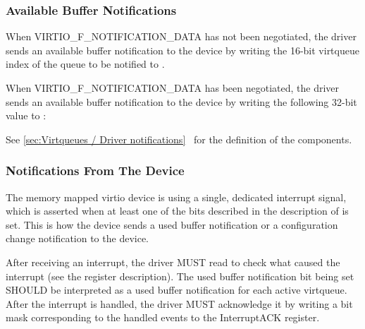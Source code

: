 \subsubsection{Available Buffer Notifications}\label{sec:Virtio Transport Options / Virtio Over MMIO / MMIO-specific Initialization And Device Operation / Available Buffer Notifications}

When VIRTIO_F_NOTIFICATION_DATA has not been negotiated,
the driver sends an available buffer notification to the device by writing
the 16-bit virtqueue index
of the queue to be notified to .

When VIRTIO_F_NOTIFICATION_DATA has been negotiated,
the driver sends an available buffer notification to the device by writing
the following 32-bit value to :


See \ref{sec:Virtqueues / Driver notifications}~
for the definition of the components.

\subsubsection{Notifications From The Device}\label{sec:Virtio Transport Options / Virtio Over MMIO / MMIO-specific Initialization And Device Operation / Notifications From The Device}

The memory mapped virtio device is using a single, dedicated
interrupt signal, which is asserted when at least one of the
bits described in the description of 
is set. This is how the device sends a used buffer notification
or a configuration change notification to the device.

After receiving an interrupt, the driver MUST read
 to check what caused the interrupt (see the
register description).  The used buffer notification bit being set
SHOULD be interpreted as a used buffer notification for each active
virtqueue.  After the interrupt is handled, the driver MUST acknowledge
it by writing a bit mask corresponding to the handled events to the
InterruptACK register.

